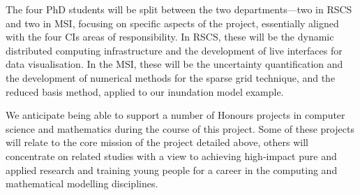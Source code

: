 The four PhD students will be split between the two departments---two
in RSCS and two in MSI, focusing on specific aspects of the project,
essentially aligned with the four CIs areas of responsibility.  In
RSCS, these will be the dynamic distributed computing infrastructure
and the development of live interfaces for data visualisation. In the
MSI, these will be the uncertainty quantification and the development
of numerical methods for the sparse grid technique, and the reduced
basis method, applied to our inundation model example.

We anticipate being able to support a number of Honours projects in
computer science and mathematics during the course of this
project. Some of these projects will relate to the core mission of the
project detailed above, others will concentrate on related studies
with a view to achieving high-impact pure and applied research and
training young people for a career in the computing and mathematical
modelling disciplines.

